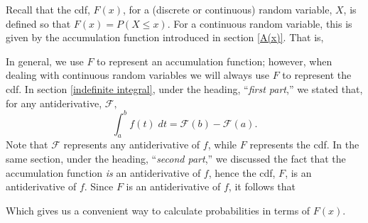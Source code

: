\noindent Recall that the cdf, $F(x)$, for a (discrete or continuous) random variable, $X$, is defined so that $F(x) = P(X \leq x)$. For a continuous random variable, this is given by the accumulation function introduced in section \ref{A(x)}. That is,

  	\bigskip
	
	\hfil{}
	\bigskip
	\bigskip

\noindent In general, we use $F$ to represent an accumulation function; however, when dealing with continuous random variables we will always use $F$ to represent the cdf. In section \ref{indefinite integral}, under the heading, ``\textit{first part},'' we stated that, for any antiderivative, $\mathcal{F},$
\[
\int_a^b f(t) \; dt = \mathcal{F}(b) - \mathcal{F}(a).
\]
Note that $\mathcal{F}$ represents any antiderivative of $f$, while $F$ represents the cdf. In the same section, under the heading, ``\textit{second part},'' we discussed the fact that the accumulation function \textit{is} an antiderivative of $f$, hence the cdf, $F$, is an antiderivative of $f$. Since $F$ is an antiderivative of $f$, it follows that

  	\bigskip
	
	\hfil{}
	\bigskip
	\bigskip

\noindent Which gives us a convenient way to calculate probabilities in terms of $F(x)$. \\

